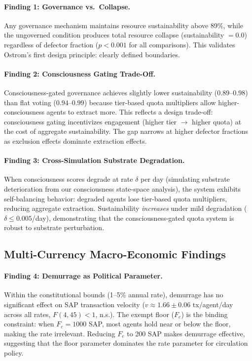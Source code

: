 \paragraph{Finding 1: Governance vs.\ Collapse.}
Any governance mechanism maintains resource sustainability above 89\%, while the
ungoverned condition produces total resource collapse (sustainability $= 0.0$) regardless
of defector fraction ($p < 0.001$ for all comparisons). This validates Ostrom's first
design principle: clearly defined boundaries.

\paragraph{Finding 2: Consciousness Gating Trade-Off.}
Consciousness-gated governance achieves slightly lower sustainability ($0.89$--$0.98$)
than flat voting ($0.94$--$0.99$) because tier-based quota multipliers allow
higher-consciousness agents to extract more. This reflects a design trade-off:
consciousness gating incentivizes engagement (higher tier $\to$ higher quota) at the cost
of aggregate sustainability. The gap narrows at higher defector fractions as exclusion
effects dominate extraction effects.

\paragraph{Finding 3: Cross-Simulation Substrate Degradation.}
When consciousness scores degrade at rate $\delta$ per day (simulating substrate
deterioration from our consciousness state-space analysis), the system exhibits
self-balancing behavior: degraded agents lose tier-based quota multipliers, reducing
aggregate extraction. Sustainability \emph{increases} under mild degradation
($\delta \leq 0.005$/day), demonstrating that the consciousness-gated quota system is
robust to substrate perturbation.

\subsection{Multi-Currency Macro-Economic Findings}

\paragraph{Finding 4: Demurrage as Political Parameter.}
Within the constitutional bounds (1--5\% annual rate), demurrage has no significant effect
on SAP transaction velocity ($v \approx 1.66 \pm 0.06$ tx/agent/day across all rates,
$F(4,45) < 1$, n.s.). The exempt floor ($F_e$) is the binding constraint: when
$F_e = 1000$ SAP, most agents hold near or below the floor, making the rate irrelevant.
Reducing $F_e$ to 200 SAP makes demurrage effective, suggesting that the floor parameter
dominates the rate parameter for circulation policy.

